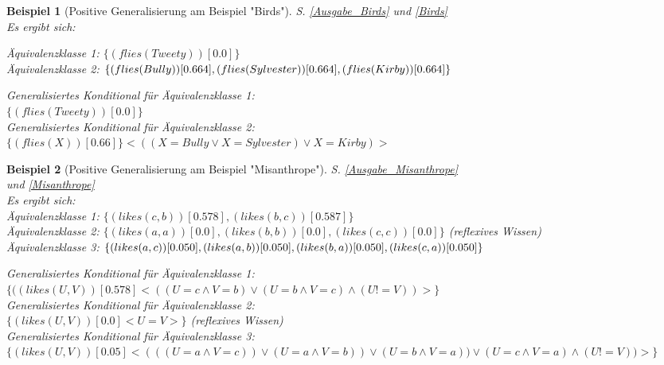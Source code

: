 \documentclass[draft]{scrreprt}
\newtheorem{Bsp}{Beispiel}[section]
\begin{document}
\begin{Bsp}[Positive Generalisierung am Beispiel "{}Birds"{}] 
	S. \ref{Ausgabe_Birds} und \ref{Birds}\\
	Es ergibt sich:
	
	\noindent
	Äquivalenzklasse 1: $\{(flies(Tweety))[0.0]\}$\\
	Äquivalenzklasse 2: $\{(flies(Bully))[0.664], (flies(Sylvester))[0.664],\\ (flies(Kirby))[0.664]\}$
	
	
	\noindent
	Generalisiertes Konditional für Äquivalenzklasse 1:\\ $\{(flies(Tweety))[0.0]\}$\\
	Generalisiertes Konditional für Äquivalenzklasse 2: \\$\{(flies(X))[0.66]\} <((X=Bully \lor X=Sylvester) \lor X=Kirby)>$
\end{Bsp}
\begin{Bsp}[Positive Generalisierung am Beispiel "{}Misanthrope"{}] 
	S. \ref{Ausgabe_Misanthrope} \\ und \ref{Misanthrope}
	\\
	Es ergibt sich:\\
	
	\noindent
	Äquivalenzklasse 1: $ \{(likes(c,b))[0.578], (likes(b,c))[0.587]\} $\\
	Äquivalenzklasse 2: $ \{(likes(a,a))[0.0], (likes(b,b))[0.0], (likes(c,c))[0.0]\} $ (reflexives Wissen)\\
	Äquivalenzklasse 3: $ \{(likes(a,c))[0.050], (likes(a,b))[0.050], (likes(b,a))[0.050], \\ (likes(c,a))[0.050]\} $

	\noindent
	Generalisiertes Konditional für Äquivalenzklasse 1:\\ $ \{((likes(U,V))[0.578] <((U=c \land V=b) \lor (U=b \land V=c) \land (U!=V))>\} $\\
	Generalisiertes Konditional für Äquivalenzklasse 2:\\ $ \{(likes(U,V))[0.0] <U=V>\} $ (reflexives Wissen)\\
	Generalisiertes Konditional für Äquivalenzklasse 3:\\ $ \{(likes(U,V))[0.05] <((( U=a \land V=c)) \lor (U=a \land V=b)) \lor (U=b \land V=a)) \lor (U=c \land V=a) \land (U!=V))>\} $\\
\end{Bsp}
\end{document}
